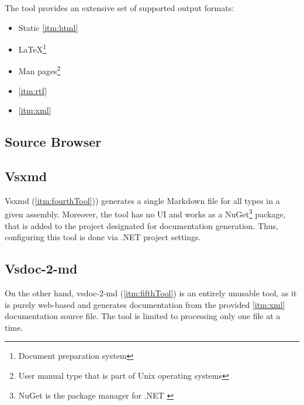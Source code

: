 The tool provides an extensive set of supported output formats:
\begin{itemize}
    \item Static \ref{itm:html}
    \item \LaTeX\footnote{Document preparation system}
    \item Man pages\footnote{User manual type that is part of Unix operating systems\cite{credocs_limited_latex_2022}}
    \item \ref{itm:rtf}
    \item \ref{itm:xml}
\end{itemize}

\subsection{Source Browser}

\subsection{Vsxmd}

Vsxmd (\ref{itm:fourthTool})) generates a single Markdown file for all types in a given assembly. Moreover, the tool has no UI and works as a NuGet\footnote{NuGet is the package manager for .NET \cite{microsoft_nuget_nodate}} package, that is added to the project designated for documentation generation. Thus, configuring this tool is done via .NET project settings.

\subsection{Vsdoc-2-md}

On the other hand, vsdoc-2-md (\ref{itm:fifthTool}) is an entirely unusable tool, as it is purely web-based and generates documentation from the provided \ref{itm:xml} documentation source file. The tool is limited to processing only one file at a time.